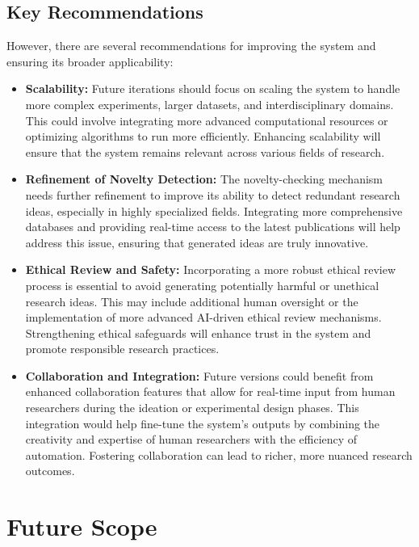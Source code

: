 \subsection{Key Recommendations}
However, there are several recommendations for improving the system and ensuring its broader applicability:
\begin{itemize}
\item \textbf{Scalability:} Future iterations should focus on scaling the system to handle more complex experiments, larger datasets, and interdisciplinary domains. This could involve integrating more advanced computational resources or optimizing algorithms to run more efficiently. Enhancing scalability will ensure that the system remains relevant across various fields of research.

\item \textbf{Refinement of Novelty Detection:} The novelty-checking mechanism needs further refinement to improve its ability to detect redundant research ideas, especially in highly specialized fields. Integrating more comprehensive databases and providing real-time access to the latest publications will help address this issue, ensuring that generated ideas are truly innovative.

\item \textbf{Ethical Review and Safety:} Incorporating a more robust ethical review process is essential to avoid generating potentially harmful or unethical research ideas. This may include additional human oversight or the implementation of more advanced AI-driven ethical review mechanisms. Strengthening ethical safeguards will enhance trust in the system and promote responsible research practices.

\item \textbf{Collaboration and Integration:} Future versions could benefit from enhanced collaboration features that allow for real-time input from human researchers during the ideation or experimental design phases. This integration would help fine-tune the system's outputs by combining the creativity and expertise of human researchers with the efficiency of automation. Fostering collaboration can lead to richer, more nuanced research outcomes.
\end{itemize}

\section{Future Scope}
